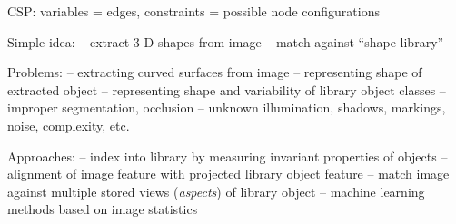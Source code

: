 \documentclass{article}
\begin{document}
\begin{huge}

\vspace*{0.2in}


CSP: variables = edges, constraints = possible node configurations


Simple idea:\al
-- extract 3-D shapes from image\al
-- match against ``shape library''

Problems:\al
-- extracting curved surfaces from image\al
-- representing shape of extracted object\al
-- representing shape and variability of library object classes\al
-- improper segmentation, occlusion\al
-- unknown illumination, shadows, markings, noise, complexity, etc.

Approaches:\al
-- index into library by measuring invariant properties of objects\al
-- alignment of image feature with projected library object feature\al
-- match image against multiple stored views (\emph{aspects}) of library object\al
-- machine learning methods based on image statistics



\end{huge}
\end{document}
